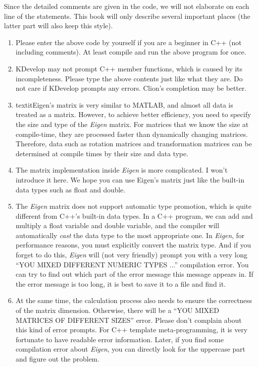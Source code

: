 Since the detailed comments are given in the code, we will not elaborate on each line of the statements. This book will only describe several important places (the latter part will also keep this style).

\begin{enumerate}
    \item Please enter the above code by yourself if you are a beginner in C++ (not including comments). At least compile and run the above program for once.
    
    \item KDevelop may not prompt C++ member functions, which is caused by its incompleteness. Please type the above contents just like what they are. Do not care if KDevelop prompts any errors. Clion's completion may be better. 
    
    \item textit{Eigen}'s matrix is very similar to MATLAB, and almost all data is treated as a matrix. However, to achieve better efficiency, you need to specify the size and type of the \textit{Eigen} matrix. For matrices that we know the size at compile-time, they are processed faster than dynamically changing matrices. Therefore, data such as rotation matrices and transformation matrices can be determined at compile times by their size and data type.
    
    \item The matrix implementation inside \textit{Eigen} is more complicated. I won't introduce it here. We hope you can use Eigen's matrix just like the built-in data types such as float and double. 
    
    \item The \textit{Eigen} matrix does not support automatic type promotion, which is quite different from C++'s built-in data types. In a C++ program, we can add and multiply a float variable and double variable, and the compiler will automatically \textit{cast} the data type to the most appropriate one. In \textit{Eigen}, for performance reasons, you must explicitly convert the matrix type. And if you forget to do this, \textit{Eigen} will (not very friendly) prompt you with a very long ``YOU MIXED DIFFERENT NUMERIC TYPES ...'' compilation error. You can try to find out which part of the error message this message appears in. If the error message is too long, it is best to save it to a file and find it.
    
    \item At the same time, the calculation process also needs to ensure the correctness of the matrix dimension. Otherwise, there will be a ``YOU MIXED MATRICES OF DIFFERENT SIZES'' error. Please don't complain about this kind of error prompts. For C++ template meta-programming, it is very fortunate to have readable error information. Later, if you find some compilation error about \textit{Eigen}, you can directly look for the uppercase part and figure out the problem.
    

\end{enumerate}
